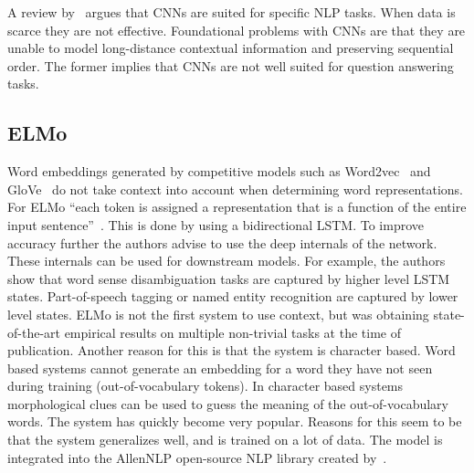 A review by~\citet{young2018recent} argues that CNNs are suited for specific NLP tasks.
When data is scarce they are not effective.
Foundational problems with CNNs are that they are unable to model long-distance contextual information and preserving sequential order.
The former implies that CNNs are not well suited for question answering tasks.

\subsection{ELMo}
\label{subsec:elmo}
Word embeddings generated by competitive models such as Word2vec~\citep{mikolov2013distributed} and GloVe~\citep{pennington2014} do not take context into account when determining word representations.
For ELMo ``each token is assigned a representation that is a function of the entire input sentence''~\citep{peters2018}.
This is done by using a bidirectional LSTM.
To improve accuracy further the authors advise to use the deep internals of the network.
These internals can be used for downstream models.
For example, the authors show that word sense disambiguation tasks are captured by higher level LSTM states.
Part-of-speech tagging or named entity recognition are captured by lower level states.
ELMo is not the first system to use context, but was obtaining state-of-the-art empirical results on multiple non-trivial tasks at the time of publication.
Another reason for this is that the system is character based.
Word based systems cannot generate an embedding for a word they have not seen during training (out-of-vocabulary tokens).
In character based systems morphological clues can be used to guess the meaning of the out-of-vocabulary words.
The system has quickly become very popular.
Reasons for this seem to be that the system generalizes well, and is trained on a lot of data.
The model is integrated into the AllenNLP open-source NLP library created by~\citet{gardner2017}.

